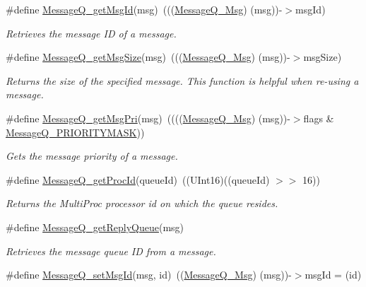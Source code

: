 \begin{DoxyCompactItemize}
\#define \hyperlink{_message_q_8h_a12f1040474ebdb289f08205ecb30fd18}{Message\-Q\-\_\-get\-Msg\-Id}(msg)~(((\hyperlink{_message_q_8h_ab675d3cdd0443a1ad05658d375458204}{Message\-Q\-\_\-\-Msg}) (msg))-\/$>$msg\-Id)
\begin{DoxyCompactList}\small\item\em Retrieves the message I\-D of a message. \end{DoxyCompactList}\item 
\#define \hyperlink{_message_q_8h_a8e3e82ba789ac47279fd35a4cf76d786}{Message\-Q\-\_\-get\-Msg\-Size}(msg)~(((\hyperlink{_message_q_8h_ab675d3cdd0443a1ad05658d375458204}{Message\-Q\-\_\-\-Msg}) (msg))-\/$>$msg\-Size)
\begin{DoxyCompactList}\small\item\em Returns the size of the specified message. This function is helpful when re-\/using a message. \end{DoxyCompactList}\item 
\#define \hyperlink{_message_q_8h_ad5fc8c9c78eaa4d37d26c8b371b82765}{Message\-Q\-\_\-get\-Msg\-Pri}(msg)~((((\hyperlink{_message_q_8h_ab675d3cdd0443a1ad05658d375458204}{Message\-Q\-\_\-\-Msg}) (msg))-\/$>$flags \& \hyperlink{_message_q_8h_a3cde3037a7d7bd3a7cf4291b939200c8}{Message\-Q\-\_\-\-P\-R\-I\-O\-R\-I\-T\-Y\-M\-A\-S\-K}))
\begin{DoxyCompactList}\small\item\em Gets the message priority of a message. \end{DoxyCompactList}\item 
\#define \hyperlink{_message_q_8h_a108ddf7170cf6f9fde0bb991768c33d0}{Message\-Q\-\_\-get\-Proc\-Id}(queue\-Id)~((U\-Int16)((queue\-Id) $>$$>$ 16))
\begin{DoxyCompactList}\small\item\em Returns the Multi\-Proc processor id on which the queue resides. \end{DoxyCompactList}\item 
\#define \hyperlink{_message_q_8h_a8af7731e0ea02352febe0f055438c5e5}{Message\-Q\-\_\-get\-Reply\-Queue}(msg)
\begin{DoxyCompactList}\small\item\em Retrieves the message queue I\-D from a message. \end{DoxyCompactList}\item 
\#define \hyperlink{_message_q_8h_a1aa25d3081a17945aecf1b4c23cef49c}{Message\-Q\-\_\-set\-Msg\-Id}(msg, id)~((\hyperlink{_message_q_8h_ab675d3cdd0443a1ad05658d375458204}{Message\-Q\-\_\-\-Msg}) (msg))-\/$>$msg\-Id = (id)
$$
\end{DoxyCompactItemize}
